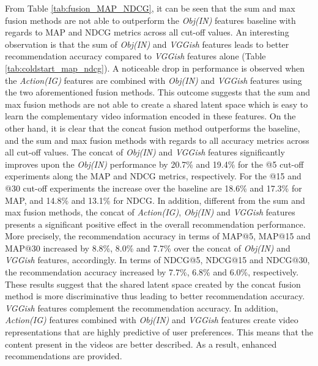 \documentclass[review]{elsarticle}
\begin{document}
From Table \ref{tab:fusion_MAP_NDCG}, it can be seen that the sum and max fusion methods are not able to outperform the \textit{Obj(IN)} features baseline with regards to MAP and NDCG metrics across all cut-off values. An interesting observation is that the sum of \textit{Obj(IN)} and \textit{VGGish} features leads to better recommendation accuracy compared to \textit{VGGish} features alone (Table \ref{tab:coldstart_map_ndcg}). A noticeable drop in performance is observed when the \textit{Action(IG)} features are combined with \textit{Obj(IN)} and \textit{VGGish} features using the two aforementioned fusion methods. This outcome suggests that the sum and max fusion methods are not able to create a shared latent space which is easy to learn the complementary video information encoded in these features. On the other hand, it is clear that the concat fusion method outperforms the baseline, and the sum and max fusion methods with regards to all accuracy metrics across all cut-off values. The concat of \textit{Obj(IN)} and \textit{VGGish} features significantly improves upon the \textit{Obj(IN)} performance by 20.7\% and 19.4\% for the @5 cut-off experiments along the MAP and NDCG metrics, respectively. For the @15 and @30 cut-off experiments the increase over the baseline are 18.6\% and 17.3\% for MAP, and 14.8\% and 13.1\% for NDCG. In addition, different from the sum and max fusion methods, the concat of \textit{Action(IG)}, \textit{Obj(IN)} and \textit{VGGish} features presents a significant positive effect in the overall recommendation performance. More precisely, the recommendation accuracy in terms of MAP@5, MAP@15 and MAP@30 increased by 8.8\%, 8.0\% and 7.7\% over the concat of \textit{Obj(IN)} and \textit{VGGish} features, accordingly. In terms of NDCG@5, NDCG@15 and NDCG@30, the recommendation accuracy increased by 7.7\%, 6.8\% and 6.0\%, respectively. These results suggest that the shared latent space created by the concat fusion method is more discriminative thus leading to better recommendation accuracy. \textit{VGGish} features complement the recommendation accuracy. In addition, \textit{Action(IG)} features combined with \textit{Obj(IN)} and \textit{VGGish} features create video representations that are highly predictive of user preferences. This means that the content present in the videos are better described. As a result, enhanced recommendations are provided. 
\end{document}
